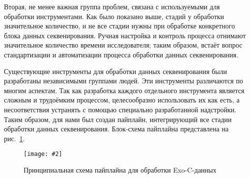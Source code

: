 \documentclass[12pt, twoside, a4paper]{article}
\newcommand{\picref}[1]{рис.~\ref{#1}}
\newcommand{\centerfigure}[5]
{\begin{figure}[#1]\centering\texttt{[image: \#2]}\caption{\label{#3}#4}\end{figure}}
\begin{document}
Вторая, не менее важная группа проблем, связана с используемыми для обработки инструментами.
Как было показано выше, стадий у обработки значительное количество, и не все стадии нужны при обработке конкретного блока данных секвенирования.
Ручная настройка и контроль процесса отнимают значительное количество времени исследователя;
таким образом, встаёт вопрос стандартизации и автоматизации процесса обработки данных секвенирования.

Существующие инструменты для обработки данных секвенирования были разработаны независимыми группами людей.
Эти инструменты различаются по многим аспектам.
% 
%
Так как разработка каждого отдельного инструмента является сложным и трудоёмким процессом, целесообразно использовать их как есть, а несоответствия устранять с помощью специально разработанной надстройки.
Таким образом, для нами был создан пайплайн, интегрирующий все стадии обработки данных секвенирования.
Блок-схема пайплайна представлена на \picref{fig:pipeline}.

\centerfigure{h}{BlockScheme.pdf}{fig:pipeline}{Принципиальная схема пайплайна для обработки Exo-C-данных}{1}
\end{document}
